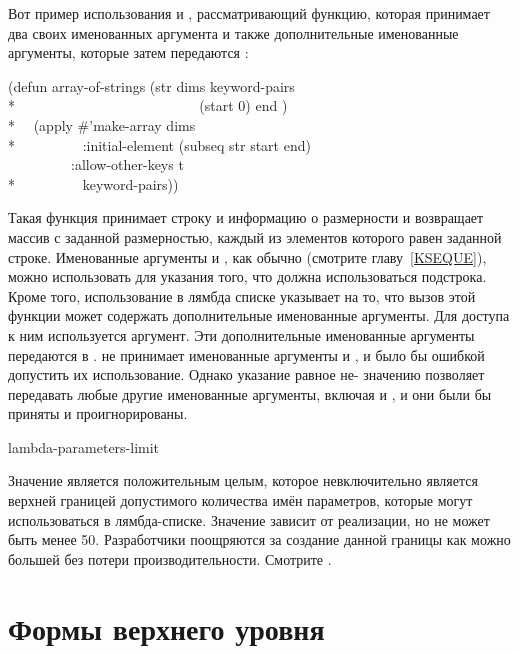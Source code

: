 Вот пример использования  и , 
рассматривающий функцию, которая принимает два своих именованных аргумента и
также дополнительные именованные аргументы, которые затем передаются
:
\begin{lisp}
(defun array-of-strings (str dims  keyword-pairs \\*
~~~~~~~~~~~~~~~~~~~~~~~~~ (start 0) end ) \\*
~~(apply \#'make-array dims \\*
~~~~~~~~~:initial-element (subseq str start end) \\
~~~~~~~~~:allow-other-keys t \\*
~~~~~~~~~keyword-pairs))
\end{lisp}

Такая функция принимает строку и информацию о размерности и возвращает массив с
заданной размерностью, каждый из элементов которого равен заданной
строке. Именованные аргументы  и , как обычно (смотрите
главу~\ref{KSEQUE}), можно использовать для указания того, что должна
использоваться подстрока. Кроме того, использование  в
лямбда списке указывает на то, что вызов этой функции может содержать
дополнительные именованные аргументы. Для доступа к ним используется 
аргумент. Эти дополнительные именованные аргументы передаются в
.  не принимает именованные аргументы
 и , и было бы ошибкой допустить их использование. Однако
указание  равное не-{\false} значению позволяет передавать
любые другие именованные аргументы, включая  и , и они были
бы приняты и проигнорированы.

\begin{defun}[Константа]
lambda-parameters-limit

Значение  является положительным целым, которое
невключительно является верхней границей допустимого количества имён параметров,
которые могут использоваться в лямбда-списке.
Значение зависит от реализации, но не может быть менее 50.
Разработчики поощряются за создание данной границы как можно большей без потери
производительности.
Смотрите .
\end{defun}

\section{Формы верхнего уровня}

